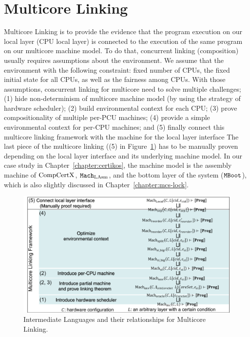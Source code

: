 \section{Multicore Linking}
\label{chapter:linking:sec:multicore-linking}

Multicore Linking is to provide the evidence that the program execution on
our local layer (CPU local layer) is connected to the execution of the same program on our multicore machine model. 
To do that, concurrent linking (composition) usually requires assumptions about the environment. 
We assume that the environment with the following constraint:
fixed number of CPUs, the fixed initial state for all CPUs,
as well as the fairness among CPUs.
With those assumptions, 
concurrent linking for multicore need to solve multiple challenges;
(1) hide non-determinism of multicore machine model (by using the strategy of hardware scheduler);
(2) build environmental context for each CPU;
(3) prove compositionality of multiple per-PCU machines;
(4) provide a simple environmental context for per-CPU machines;
and (5) finally connect this multicore linking framework with the machine for the local layer interface
The last piece of the multicore linking ((5) in Figure~\ref{fig:chapter:conlink:intermediate-languages-and-their-relationsihps-for-multicore-linking}) 
has to be manually proven depending on the local layer interface and its underlying machine model. 
In our case study in Chapter~\ref{chapter:certikos}, the machine model is the assembly machine of $\mathrm{CompCertX}$, ${\mathrm{\texttt{Mach}}}_{\mathrm{LAsm}}$,
and the bottom layer of the system (${\mathrm{\texttt{MBoot}}}$), which is also slightly discussed in Chapter~\ref{chapter:mcs-lock}.
\begin{figure}
\begin{center}
\includegraphics[width=\textwidth, page=1]{figs/conlink/concurrent_linking}
\end{center}
\caption{Intermediate Languages and their relationships for Multicore Linking.}
\label{fig:chapter:conlink:intermediate-languages-and-their-relationsihps-for-multicore-linking}
\end{figure}
